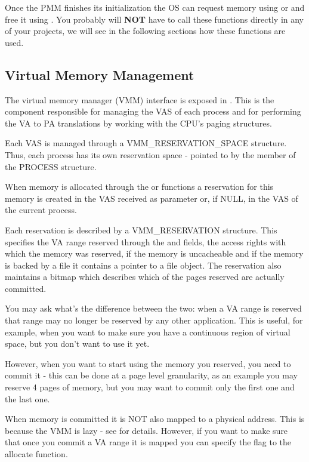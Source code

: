 \begin{appendices}
Once the PMM finishes its initialization the OS can request memory using  or
 and free it using . You probably will \textbf{NOT}
have to call these functions directly in any of your projects, we will see in the following sections
how these functions are used.

\subsection{Virtual Memory Management}
\label{sect:VMM}

The virtual memory manager (VMM) interface is exposed in . This is the component
responsible for managing the VAS of each process and for performing the VA to PA translations by
working with the CPU's paging structures.

Each VAS is managed through a VMM\_RESERVATION\_SPACE structure. Thus, each process has its own
reservation space - pointed to by the  member of the PROCESS structure.

When memory is allocated through the  or  functions a
reservation for this memory is created in the VAS received as parameter or, if NULL, in the VAS of
the current process.

Each reservation is described by a VMM\_RESERVATION structure. This specifies the VA range reserved
through the  and  fields, the access rights with which the memory was
reserved, if the memory is uncacheable and if the memory is backed by a file it contains a pointer
to a file object. The reservation also maintains a bitmap which describes which of the pages reserved
are actually committed.

You may ask what's the difference between the two: when a VA range is reserved that range may no
longer be reserved by any other application. This is useful, for example, when you want to make sure
you have a continuous region of virtual space, but you don't want to use it yet.

However, when you want to start using the memory you reserved, you need to commit it - this can be
done at a page level granularity, as an example you may reserve 4 pages of memory, but you may want 
to commit only the first one and the last one.

When memory is committed it is NOT also mapped to a physical address. This is because the VMM is
lazy - see  for details. However, if you want to make sure that once you 
commit a VA range it is mapped you can specify the  flag
to the allocate function.


\end{appendices}
